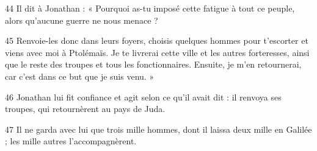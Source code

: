 
44 Il dit à Jonathan : « Pourquoi as-tu imposé cette fatigue à tout ce peuple, alors qu’aucune guerre ne nous menace ?

45 Renvoie-les donc dans leurs foyers, choisis quelques hommes pour t’escorter et viens avec moi à Ptolémaïs. Je te livrerai cette ville et les autres forteresses, ainsi que le reste des troupes et tous les fonctionnaires. Ensuite, je m’en retournerai, car c’est dans ce but que je suis venu. »

46 Jonathan lui fit confiance et agit selon ce qu’il avait dit : il renvoya ses troupes, qui retournèrent au pays de Juda.

47 Il ne garda avec lui que trois mille hommes, dont il laissa deux mille en Galilée ; les mille autres l’accompagnèrent.
